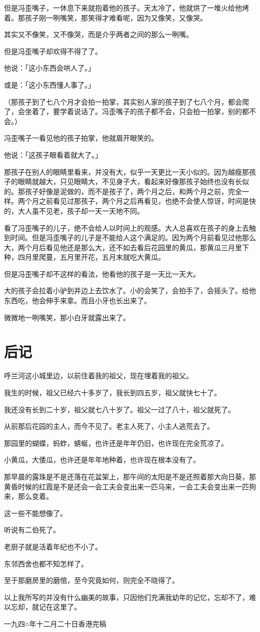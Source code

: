 \documentclass[UTF8]{ctexart}
\begin{document}
但是冯歪嘴子，一休息下来就抱着他的孩子。天太冷了，他就烘了一堆火给他烤着。那孩子刚一咧嘴笑，那笑得才难看呢，因为又像笑，又像哭。

其实又不像笑，又不像哭，而是介乎两者之间的那么一咧嘴。

但是冯歪嘴子却欢得不得了了。

他说：「这小东西会哄人了。」

或是：「这小东西懂人事了。」

（那孩子到了七八个月才会拍一拍掌，其实别人家的孩子到了七八个月，都会爬了，会坐着了，要学着说话了。冯歪嘴子的孩子都不会，只会拍一拍掌，别的都不会。）

冯歪嘴子一看见他的孩子拍掌，他就眉开眼笑的。

他说：「这孩子眼看着就大了。」

那孩子在别人的眼睛里看来，并没有大，似乎一天更比一天小似的。因为越瘦那孩子的眼睛就越大，只见眼睛大，不见身子大，看起来好像那孩子始终也没有长似的。那孩子好像是泥做的，而不是孩子了，两个月之后，和两个月之前，完全一样。两个月之前看见过那孩子，两个月之后再看见，也绝不会使人惊讶，时间是快的，大人虽不见老，孩子却一天一天地不同。

看了冯歪嘴子的儿子，绝不会给人以时间上的观感。大人总喜欢在孩子的身上去触到时间。但是冯歪嘴子的儿子是不能给人这个满足的。因为两个月前看见过他那么大，两个月后看见他还是那么大，还不如去看后花园里的黄瓜，那黄瓜三月里下种，四月里爬蔓，五月里开花，五月末就吃大黄瓜。

但是冯歪嘴子却不这样的看法，他看他的孩子是一天比一天大。

大的孩子会拉着小驴到井边上去饮水了。小的会笑了，会拍手了，会摇头了。给他东西吃，他会伸手来拿。而且小牙也长出来了。

微微地一咧嘴笑，那小白牙就露出来了。

\section{后记}

呼兰河这小城里边，以前住着我的祖父，现在埋着我的祖父。

我生的时候，祖父已经六十多岁了，我长到四五岁，祖父就快七十了。

我还没有长到二十岁，祖父就七八十岁了。祖父一过了八十，祖父就死了。

从前那后花园的主人，而今不见了。老主人死了，小主人逃荒去了。

那园里的蝴蝶，蚂蚱，蜻蜒，也许还是年年仍旧，也许现在完全荒凉了。

小黄瓜，大倭瓜，也许还是年年地种着，也许现在根本没有了。

那早晨的露珠是不是还落在花盆架上，那午间的太阳是不是还照着那大向日葵，那黄昏时候的红霞是不是还会一会工夫会变出来一匹马来，一会工夫会变出来一匹狗来，那么变着。

这一些不能想像了。

听说有二伯死了。

老厨子就是活着年纪也不小了。

东邻西舍也都不知怎样了。

至于那磨房里的磨倌，至今究竟如何，则完全不晓得了。

以上我所写的并没有什么幽美的故事，只因他们充满我幼年的记忆，忘却不了，难以忘却，就记在这里了。

一九四○年十二月二十日香港完稿
\end{document}
